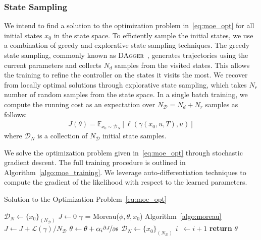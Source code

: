 \subsubsection{State Sampling}

We intend to find a solution to the optimization problem
in~\eqref{eq:moe_opt} for all initial states $x_0$ in the
state space.
%
To efficiently sample the initial states, we use a combination of greedy and
explorative state sampling techniques.
%
The greedy state sampling, commonly known as \textsc{DAgger}~\cite{ross2011no},
generates trajectories using the current parameters and collects $N_d$ samples
from the visited states. 
%
This allows the training to refine the controller on the states it visits the
most.
%
We recover from locally optimal solutions through explorative state sampling,
which takes $N_r$ number of random samples from the state space.
%
In a single batch training, we compute the running cost as an expectation
over $N_{\mathcal{D}} = N_d+N_r$ samples as follows:
\begin{align*}
    J(\theta) = \mathbb{E}_{x_0 \sim \mathcal{D}_N}[ \ell(\gamma(x_0, u, T), u)]
\end{align*}
\noindent where $\mathcal{D}_N$ is a collection of $N_{\mathcal{D}}$ initial state samples.

We solve the optimization problem given in~\eqref{eq:moe_opt} through stochastic
gradient descent.
%
The full training procedure is outlined in Algorithm~\eqref{algo:moe_training}.
%
We leverage auto-differentiation techniques to compute the gradient of the
likelihood with respect to the learned parameters.
\begin{algorithm}
      \caption{Solution to the Optimization Problem~\eqref{eq:moe_opt}}
      \label{algo:moe_training}
      \small
      \begin{algorithmic}[1]
          \algrenewcommand\algorithmicindent{0em} %
          \State $\mathcal{D}_N \gets \{x_0\}_{(N_{\mathcal{D}})}$   
          \algrenewcommand\algorithmicindent{1.1em} %
          \State $J \gets 0$
              \State $\gamma$ = Moreau($\phi, \theta, x_0$) \Comment Algorithm~\eqref{algo:moreau}
              \State $J \gets J + \mathcal{L}(\gamma)/N_{\mathcal{D}}$ 
          \EndFor
          \State $\theta \gets \theta + \alpha_i \nicefrac{\partial J}{\partial \theta}$
          \State $\mathcal{D}_N \gets \{x_0\}_{(N_{\mathcal{D}})}$
          \State $i \;\:\gets i + 1$
          \EndWhile
          \State \textbf{return} $\theta$
      \end{algorithmic}
  \end{algorithm}

